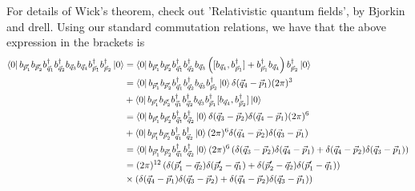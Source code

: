 \documentclass[11pt, oneside]{article}   	%
\theoremstyle{newline}
\theoremstyle{newline}
\theoremstyle{newline}
\theoremstyle{newline}
\theoremstyle{newline}
\begin{document}
For details of Wick's theorem, check out 'Relativistic quantum fields', 
by Bjorkin and drell. 
Using our standard commutation relations, we have that the above expression in 
the brackets is 
\begin{align*}
\bra{ 0 } b_{ \vec{p} _1 ' } b_{ \vec{p}_ 2 ' } b_{\vec{q}_ 1 } ^ \dagger b_{ \vec{q}_ 2 } ^ \dagger b_{ \vec{q} _ 3 } b_{ \vec{q} _ 4 } b_{\vec{p}_ 1 }^ \dagger b_{ \vec{p}_ 2 } ^ \dagger \ket{ 0 } &=  \bra{ 0 } b_{ \vec{p}_ 1 ' } b _{ \vec{p} _ 2 ' } b_{ \vec{q} _ 1 } ^ \dagger b_{ \vec{q} _ 2 } ^ \dagger b_{ \vec{q} _ 3 } 
\left( [ b _{ \vec{q}_ 4 } , b_{ \vec{p}_ 1 } ^ \dagger ] + 
b _{ \vec{p} _ 1} ^ \dagger b _{ \vec{q} _4 } \right) b_{ \vec{p} _ 2 } ^ \dagger \ket{ 0 }  \\
&= \bra{ 0 } b_{ \vec{p} _ 1 '} b_{ \vec{p} _ 2 ' } b_{ \vec{q} _ 1 } ^ \dagger b_{ \vec{q} _ 2 } ^ \dagger
b_{ \vec{q} _ 3 } b_{ \vec{p} _ 2 } ^ \dagger \ket{ 0 } \delta ( \vec{q} _ 4 - \vec{p} _ 1 ) ( 2 \pi ) ^ 3
\\
& + \bra{ 0 } b_{ \vec{p}_ 1 ' } b_{ \vec{p} _ 2 ' } b_{ \vec{q} _ 1 }^ \dagger b_{ \vec{q} _ 2 } ^ \dagger b _{ \vec{q} _ 3 } b_{ \vec{p} _ 1 }^ \dagger [ b_{ \vec{q} _ 4 } , b _{ \vec{p} _ 2 } ^ \dagger]  \ket{ 0 } \\
& = \bra{ 0 } b_{ \vec{p} _ 1 ' } b_{ \vec{p}_ 2 ' } b_{\vec{q} _ 1 } ^ \dagger b_{ \vec{q} _ 2 } ^ \dagger \ket{ 0 } \delta ( \vec{q}_ 3 - \vec{p} _ 2 ) \delta ( \vec{q} _4 - \vec{p}_ 1 ) ( 2 \pi ) ^ 6 \\
&+ \bra{ 0 } b_{\vec{p} _1 '} b_{\vec{p} _ 2 ' } b_{\vec{q} _ 1} ^ \dagger b_{ \vec{q} _ 2 } ^ \dagger \ket{ 0 } ( 2 \pi ) ^ 6 \delta ( \vec{q} _ 4 - \vec{p} _ 2 ) \delta ( \vec{q} _ 3 - \vec{p} _ 1 ) \\
& = \bra{ 0 } b_{ \vec{p} _ 1' } b_{ \vec{p} _ 2 ' } b_{ \vec{q} _ 1 }^ \dagger b_{ \vec{q} _ 2 }^ \dagger \ket{ 0 }  ( 2 \pi ) ^ 6 \left( \delta ( \vec{q} _3 - \vec{p} _ 2 ) \delta ( \vec{q} _ 4 - \vec{p} _ 1 ) + \delta ( \vec{q} _ 4 - \vec{p} _ 2 ) \delta ( \vec{q}_ 3 - \vec{p} _ 1 ) \right) \\
& = 
( 2 \pi ) ^{  12 } \left( \delta ( \vec{p}_ 1 ' - \vec{q} _ 2 ) \delta ( \vec{p}_ 2' - \vec{q} _ 1 )  + \delta ( \vec{p}_2 '  - \vec{q}_ 2 ) \delta ( \vec{p}_1' - \vec{q}_ 1 ) \right) \\
& \times ( \delta ( \vec{q}_ 4 - \vec{p}_ 1 ) \delta ( \vec{q} _ 3 - \vec{p} _ 2 ) + \delta ( \vec{q}_ 4 - \vec{p} _ 2 ) \delta ( \vec{q}_ 3 - \vec{p}_ 1 ) ) 
\end{align*} 
\end{document}
